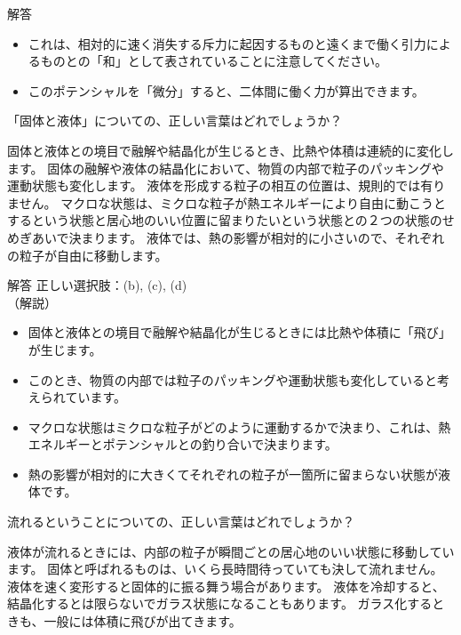 \documentclass[uplatex,dvipdfmx,a4paper,11pt]{jsarticle}
\begin{document}
\begin{qlist}
\begin{itembox}[l]{解答}
\begin{itemize}
				\item これは、相対的に速く消失する斥力に起因するものと遠くまで働く引力によるものとの「和」として表されていることに注意してください。
				\item このポテンシャルを「微分」すると、二体間に働く力が算出できます。
			\end{itemize}
        \end{itembox}
	\qitem 「固体と液体」についての、正しい言葉はどれでしょうか？
		\begin{qlist2}
			\qitem 固体と液体との境目で融解や結晶化が生じるとき、比熱や体積は連続的に変化します。
			\qitem 固体の融解や液体の結晶化において、物質の内部で粒子のパッキングや運動状態も変化します。
			\qitem 液体を形成する粒子の相互の位置は、規則的では有りません。
			\qitem マクロな状態は、ミクロな粒子が熱エネルギーにより自由に動こうとするという状態と居心地のいい位置に留まりたいという状態との２つの状態のせめぎあいで決まります。
			\qitem 液体では、熱の影響が相対的に小さいので、それぞれの粒子が自由に移動します。
		\end{qlist2}	
        \vspace{3mm}
        \begin{itembox}[l]{解答}
            正しい選択肢：(b), (c), (d)\\
            （解説）
            \begin{itemize}
				\item 固体と液体との境目で融解や結晶化が生じるときには比熱や体積に「飛び」が生じます。
				\item このとき、物質の内部では粒子のパッキングや運動状態も変化していると考えられています。
				\item マクロな状態はミクロな粒子がどのように運動するかで決まり、これは、熱エネルギーとポテンシャルとの釣り合いで決まります。
				\item 熱の影響が相対的に大きくてそれぞれの粒子が一箇所に留まらない状態が液体です。
			\end{itemize}
        \end{itembox}
	\qitem 流れるということについての、正しい言葉はどれでしょうか？
		\begin{qlist2}
			\qitem 液体が流れるときには、内部の粒子が瞬間ごとの居心地のいい状態に移動しています。
			\qitem 固体と呼ばれるものは、いくら長時間待っていても決して流れません。
			\qitem 液体を速く変形すると固体的に振る舞う場合があります。
			\qitem 液体を冷却すると、結晶化するとは限らないでガラス状態になることもあります。
			\qitem ガラス化するときも、一般には体積に飛びが出てきます。
		\end{qlist2}	

\end{qlist}
\end{document}
